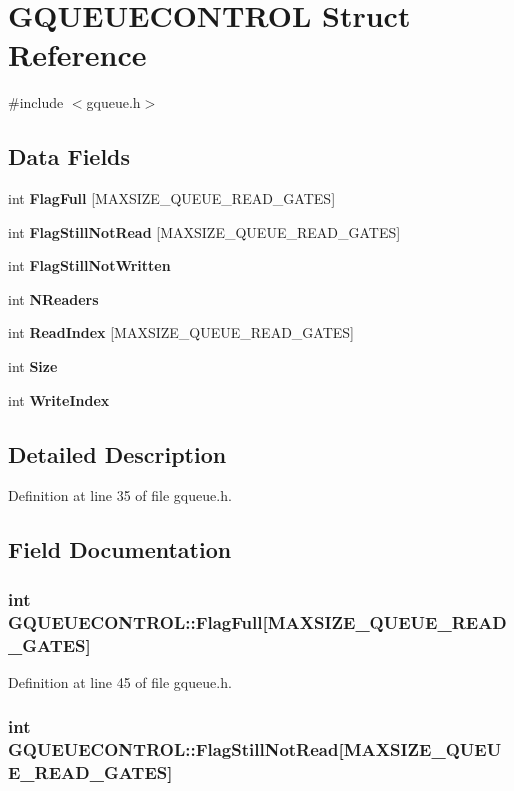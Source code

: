 \section{GQUEUECONTROL Struct Reference}
\label{structGQUEUECONTROL}


{\ttfamily \#include $<$gqueue.h$>$}\subsection*{Data Fields}
\begin{DoxyCompactItemize}
\item 
int {\bf FlagFull} [MAXSIZE\_\-QUEUE\_\-READ\_\-GATES]
\item 
int {\bf FlagStillNotRead} [MAXSIZE\_\-QUEUE\_\-READ\_\-GATES]
\item 
int {\bf FlagStillNotWritten}
\item 
int {\bf NReaders}
\item 
int {\bf ReadIndex} [MAXSIZE\_\-QUEUE\_\-READ\_\-GATES]
\item 
int {\bf Size}
\item 
int {\bf WriteIndex}
\end{DoxyCompactItemize}


\subsection{Detailed Description}


Definition at line 35 of file gqueue.h.

\subsection{Field Documentation}
\subsubsection[{FlagFull}]{\setlength{\rightskip}{0pt plus 5cm}int {\bf GQUEUECONTROL::FlagFull}[MAXSIZE\_\-QUEUE\_\-READ\_\-GATES]}\label{structGQUEUECONTROL_a5f54a26afa8554ed2f161b83aba14f5c}


Definition at line 45 of file gqueue.h.
\subsubsection[{FlagStillNotRead}]{\setlength{\rightskip}{0pt plus 5cm}int {\bf GQUEUECONTROL::FlagStillNotRead}[MAXSIZE\_\-QUEUE\_\-READ\_\-GATES]}\label{structGQUEUECONTROL_a9336a08f0410235b38b78638b0e3f882}


